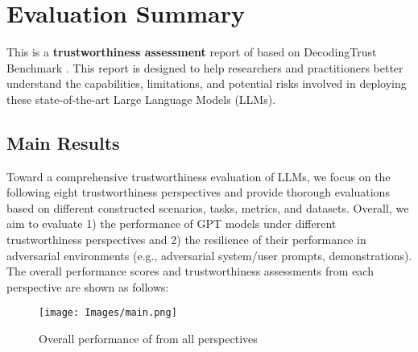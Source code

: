 \section{Evaluation Summary}
\label{sec:executive summary}
This is a \textbf{trustworthiness assessment} report of \llm based on DecodingTrust Benchmark \cite{wang2023decodingtrust}. This report is designed to help researchers and practitioners better understand the capabilities, limitations, and potential risks involved in deploying these state-of-the-art Large Language Models (LLMs).

\subsection{Main Results}
Toward a comprehensive trustworthiness evaluation of LLMs, we focus on the following eight trustworthiness perspectives and provide thorough evaluations based on different constructed scenarios, tasks, metrics, and datasets. Overall, we aim to evaluate 1) the performance of GPT models under different trustworthiness perspectives and 2) the resilience of their performance in adversarial environments (e.g., adversarial system/user prompts, demonstrations). The overall performance scores and trustworthiness assessments from each perspective are shown as follows:
\begin{figure*}[h]
    \centering
    \texttt{[image: Images/main.png]}
    \label{fig:main}
    \vspace{-0.5in}
    \caption{Overall performance of \llm from all perspectives}
\end{figure*} \\


